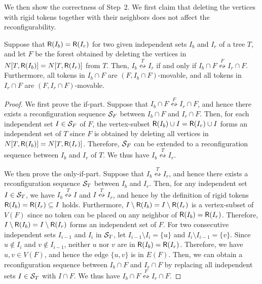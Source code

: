 \documentclass{llncs}
\newcommand{\Neiclosed}[2]{N[#1, #2]}
\newcommand{\bfI}{I}
\newcommand{\calS}{{\cal S}}
\newcommand{\sevstep}{\leftrightsquigarrow}
\newcommand{\sevstepT}[1]{\overset{#1}{\sevstep}}
\newcommand{\ImSet}[1]{{\sf R}(\bfI_{#1})}
\newcommand{\Forest}{F}
\newcounter{two}
\begin{document}
	We then show the correctness of Step~2. 
	We first claim that deleting the vertices with rigid tokens together with their neighbors does not affect the reconfigurability. 
	\begin{lemma} \label{lem:step2}
	Suppose that $\ImSet{b} = \ImSet{r}$ for two given independent sets $\bfI_b$ and $\bfI_r$ of a tree $T$, and let $\Forest$ be the forest obtained by deleting the vertices in $\Neiclosed{T}{\ImSet{b}} = \Neiclosed{T}{\ImSet{r}}$ from $T$.
	Then, $\bfI_b \sevstepT{T} \bfI_r$ if and only if $\bfI_b \cap \Forest \sevstepT{\Forest} \bfI_r \cap \Forest$.
	Furthermore, all tokens in $\bfI_b \cap \Forest$ are $(\Forest, \bfI_b \cap \Forest)$-movable, and all tokens in $\bfI_r \cap \Forest$ are $(\Forest, \bfI_r \cap \Forest)$-movable.
	\end{lemma}
	\begin{proof}
	We first prove the if-part. 
	Suppose that $\bfI_b \cap \Forest \sevstepT{\Forest} \bfI_r \cap \Forest$, and hence there exists a reconfiguration sequence $\calS_{\Forest}$ between $\bfI_b \cap \Forest$ and $\bfI_r \cap \Forest$. 
	Then, for each independent set $\bfI \in \calS_{\Forest}$ of $\Forest$, the vertex-subset $\ImSet{b} \cup \bfI = \ImSet{r} \cup \bfI$ forms an independent set of $T$ since $\Forest$ is obtained by deleting all vertices in $\Neiclosed{T}{\ImSet{b}} = \Neiclosed{T}{\ImSet{r}}$. 
	Therefore, $\calS_{\Forest}$ can be extended to a reconfiguration sequence between $\bfI_b$ and $\bfI_r$ of $T$. 
	We thus have $\bfI_b \sevstepT{T} \bfI_r$. 
	
	We then prove the only-if-part. 
	Suppose that $\bfI_b \sevstepT{T} \bfI_r$, and hence there exists a reconfiguration sequence $\calS_T$ between $\bfI_b$ and $\bfI_r$. 
	Then, for any independent set $\bfI \in \calS_T$, we have $\bfI_b \sevstepT{T} \bfI$ and $\bfI \sevstepT{T} \bfI_r$, and hence by the definition of rigid tokens $\ImSet{b} = \ImSet{r} \subseteq \bfI$ holds. 
	Furthermore, $\bfI \setminus \ImSet{b} = \bfI \setminus \ImSet{r}$ is a vertex-subset of $V(\Forest)$ since no token can be placed on any neighbor of $\ImSet{b} = \ImSet{r}$. 
	Therefore, $\bfI \setminus \ImSet{b} = \bfI \setminus \ImSet{r}$ forms an independent set of $\Forest$. 
	For two consecutive independent sets $\bfI_{i-1}$ and $\bfI_i$ in $\calS_T$, let $\bfI_{i-1} \setminus \bfI_{i} = \{u\}$ and $\bfI_{i} \setminus \bfI_{i-1} = \{v\}$. 
	Since $u \notin \bfI_{i}$ and $v \notin \bfI_{i-1}$, neither $u$ nor $v$ are in $\ImSet{b} = \ImSet{r}$.
	Therefore, we have $u, v \in V(\Forest)$, and hence the edge $\{u, v\}$ is in $E(\Forest)$. 
	Then, we can obtain a reconfiguration sequence between $\bfI_b \cap \Forest$ and $\bfI_r \cap \Forest$ by replacing all independent sets $\bfI \in \calS_T$ with $\bfI \cap \Forest$. 
	We thus have $\bfI_b \cap \Forest \sevstepT{\Forest} \bfI_r \cap \Forest$. 
\smallskip
	

\end{proof}
\end{document}
